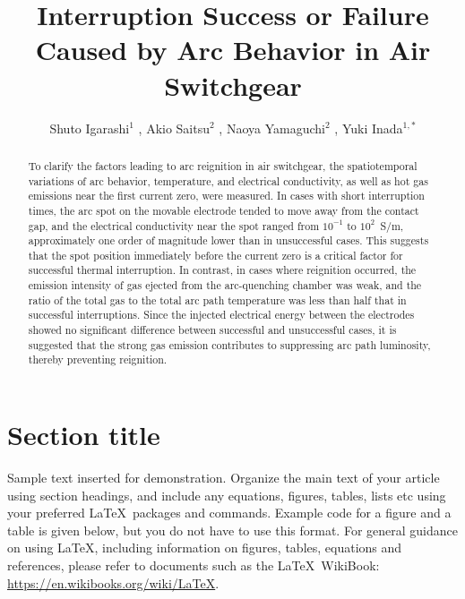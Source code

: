 \documentclass{iopjournal}
\begin{document}

\title{Interruption Success or Failure Caused by Arc Behavior in Air Switchgear}

\author{Shuto Igarashi$^1$ , Akio Saitsu$^2$ , Naoya Yamaguchi$^2$ , Yuki Inada$^{1,*}$}







\begin{abstract}
To clarify the factors leading to arc reignition in air switchgear, the spatiotemporal variations of arc behavior, temperature, 
and electrical conductivity, as well as hot gas emissions near the first current zero, were measured. 
In cases with short interruption times, the arc spot on the movable electrode tended to move away from the contact gap, 
and the electrical conductivity near the spot ranged from $10^{-1}$ to $10^{2}$~S/m, approximately one order of magnitude lower than in unsuccessful cases. 
This suggests that the spot position immediately before the current zero is a critical factor for successful thermal interruption. 
In contrast, in cases where reignition occurred, the emission intensity of gas ejected from the arc-quenching chamber was weak, 
and the ratio of the total gas to the total arc path temperature was less than half that in successful interruptions. 
Since the injected electrical energy between the electrodes showed no significant difference between successful and unsuccessful cases, 
it is suggested that the strong gas emission contributes to suppressing arc path luminosity, thereby preventing reignition.
\end{abstract}

\section{Section title}
Sample text inserted for demonstration. Organize the main text of your article using section headings, and include any equations, figures, tables, lists etc using your preferred \LaTeX\ packages and commands. Example code for a figure and a table is given below, but you do not have to use this format. For general guidance on using \LaTeX , including information on figures, tables, equations and references, please refer to documents such as the \LaTeX\ WikiBook: \href{https://en.wikibooks.org/wiki/LaTeX}{https://en.wikibooks.org/wiki/LaTeX}.
\end{document}
